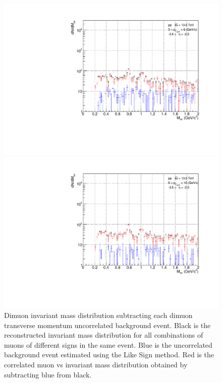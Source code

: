 \begin{figure}[H]
                    \\
                    \vspace{1em}
                    \begin{minipage}{0.45\textwidth}
                        \centering
                        \includegraphics[width=\textwidth]{fig/3_4_1_CB_pt_5to6.pdf}
                        \caption*{$5 < p_{T\mu\mu} < 6 (\mathrm{GeV/c})$}
                    \end{minipage}
                    \hfill
                    \begin{minipage}{0.45\textwidth}
                        \centering
                        \includegraphics[width=\textwidth]{fig/3_4_1_CB_pt_6to10.pdf}
                        \caption*{$6 < p_{T\mu\mu} < 10 (\mathrm{GeV/c})$}
                    \end{minipage}
                    \caption{Dimuon invariant mass distribution subtracting each dimuon transverse momentum uncorrelated background event. Black is the reconstructed invariant mass distribution for all combinations of muons of different signs in the same event. Blue is the uncorrelated background event estimated using the Like Sign method. Red is the correlated muon vs invariant mass distribution obtained by subtracting blue from black.}
                    \label{Analysis:Dimuon:CB:CB_pt_separation}
                \end{figure}
